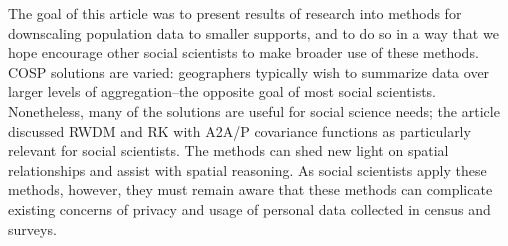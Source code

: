The goal of this article was to present results of research into methods for downscaling population data to smaller supports, and to do so in a way that we hope encourage other social scientists to make broader use of these methods.  COSP solutions are varied: geographers typically wish to summarize data over larger levels of aggregation--the opposite goal of most social scientists.  Nonetheless, many of the solutions are useful for social science needs; the article discussed RWDM and RK with A2A/P covariance functions as particularly relevant for social scientists.  The methods can shed new light on spatial relationships and assist with spatial reasoning.  As social scientists apply these methods, however, they must remain aware that these methods can complicate existing concerns of privacy and usage of personal data collected in census and surveys.

